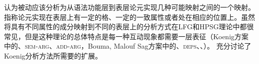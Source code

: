 \begin{exe}
\begin{xlist}[iv.]
\begin{exe}
\begin{xlist}[iv.]
 \citet[\S~6.3]{CJ2005a}认为被动应该分析为从语法功能层到表层论元实现几种可能映射之间的一个映射。指称论元实现在表层上有一定的格、一定的一致属性或者处在相应的位置上。虽然将具有不同属性的成分映射到不同的表层上的分析方式在LFG和HPSG理论\citep*{Koenig99a,BMS2001a}中都很常见，但是这种理论的总体特点是每一种互动现象都需要一层表征（Koenig方案中的\argstc、\textsc{sem-arg}、\textsc{add-arg}，Bouma, Malouf \biband Sag方案中的\argstc、\textsc{deps}、\sprc、\compsc）。 充分讨论了Koenig分析方法所需要的扩展。


\end{xlist}
\end{exe}
\end{xlist}
\end{exe}
